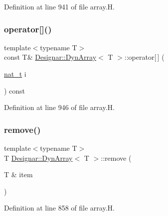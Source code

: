 Definition at line 941 of file array.\+H.

\mbox{\label{class_designar_1_1_dyn_array_af329e06efe69cb53e9d1a44a1ed0beeb}} 
\subsubsection{\texorpdfstring{operator[]()}{operator[]()}\hspace{0.1cm}{\footnotesize\ttfamily [2/2]}}
{\footnotesize\ttfamily template$<$typename T$>$ \\
const T\& \hyperlink{class_designar_1_1_dyn_array}{Designar\+::\+Dyn\+Array}$<$ T $>$\+::operator\mbox{[}$\,$\mbox{]} (\begin{DoxyParamCaption}\item[{\hyperlink{namespace_designar_aa72662848b9f4815e7bf31a7cf3e33d1}{nat\+\_\+t}}]{i }\end{DoxyParamCaption}) const\hspace{0.3cm}{\ttfamily [inline]}}



Definition at line 946 of file array.\+H.

\mbox{\label{class_designar_1_1_dyn_array_a989a057758da83805138d432d1d4c164}} 
\subsubsection{\texorpdfstring{remove()}{remove()}}
{\footnotesize\ttfamily template$<$typename T$>$ \\
T \hyperlink{class_designar_1_1_dyn_array}{Designar\+::\+Dyn\+Array}$<$ T $>$\+::remove (\begin{DoxyParamCaption}\item[{T \&}]{item }\end{DoxyParamCaption})\hspace{0.3cm}{\ttfamily [inline]}}



Definition at line 858 of file array.\+H.

\mbox{\label{class_designar_1_1_dyn_array_a86705ec7e30d0a2f5650baf34dd702d2}} 
